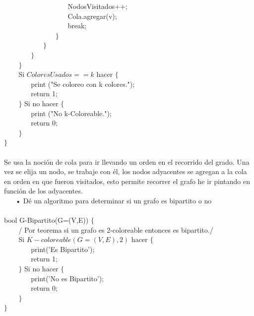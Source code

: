\documentclass[a4paper,12pt]{article}
\begin{document}
$~~~~~~~~~~~~~~~~~~~~~~~~~~~~~~~~~~~~~~~~$ NodosVisitados++;\\
$~~~~~~~~~~~~~~~~~~~~~~~~~~~~~~~~~~~~~~~~$ Cola.agregar(v);\\
$~~~~~~~~~~~~~~~~~~~~~~~~~~~~~~~~~~~~~~~~$ break;\\
$~~~~~~~~~~~~~~~~~~~~~~~~~~~~~~~~$ $\}$ \\
$~~~~~~~~~~~~~~~~~~~~~~~~$ $\}$ \\
$~~~~~~~~~~~~~~~~$ $\}$\\
$~~~~~~~~$ $\}$\\
$~~~~~~~~$ Si $ColoresUsados == k$ hacer $\{$ \\
$~~~~~~~~~~~~~~~~$ print ("Se coloreo con {k} colores.");\\
$~~~~~~~~~~~~~~~~$ return 1;\\
$~~~~~~~~$ $\}$ Si no hacer $\{$ \\
$~~~~~~~~~~~~~~~~$ print ("No {k}-Coloreable.");\\
$~~~~~~~~~~~~~~~~$ return 0;\\
$~~~~~~~~$ $\}$\\
$\}$\\
\\ Se usa la noción de cola para ir llevando un orden en el recorrido del grado. Una vez se elija un nodo, se trabaje con él, los nodos adyacentes se agregan a la cola en orden en que fueron visitados, esto permite recorrer el grafo he ir pintando en función de los adyacentes. \\

$ ~~~~~~ $ • Dé un algoritmo para determinar si un grafo es bipartito o no \\
\\
bool G-Bipartito(G=(V,E)) $\{$ \\
$~~~~~~~~$ / Por teorema si un grafo es 2-coloreable entonces es bipartito./ \\
$~~~~~~~~$ Si $K-coloreable(G=(V,E), 2)$ hacer $\{$\\
$~~~~~~~~~~~~~~~~$ print('Es Bipartito');\\
$~~~~~~~~~~~~~~~~$ return 1;\\
$~~~~~~~~$ $\}$ Si no hacer $\{$\\
$~~~~~~~~~~~~~~~~$ print('No es Bipartito');\\
$~~~~~~~~~~~~~~~~$ return 0;\\
$~~~~~~~~$ $\}$\\
$\}$ \\
\end{document}

